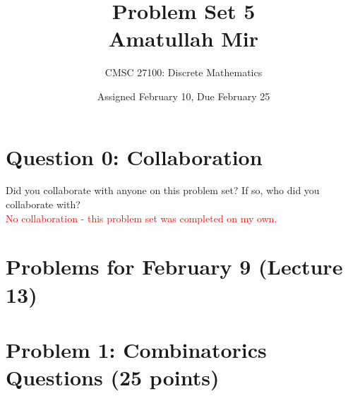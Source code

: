 \documentclass[12pt]{article}
\title{%
  Problem Set 5 \\
  \large Amatullah Mir}
\author{CMSC 27100: Discrete Mathematics}
\date{Assigned February 10, Due February 25}
\begin{document}
\maketitle
\thispagestyle{empty}
\section*{Question 0: Collaboration}
Did you collaborate with anyone on this problem set? If so, who did you collaborate with? \\ \textcolor{red}{No collaboration - this problem set was completed on my own.}
\section{Problems for February 9 (Lecture 13)}
\section*{Problem 1: Combinatorics Questions (25 points)}
\end{document}
